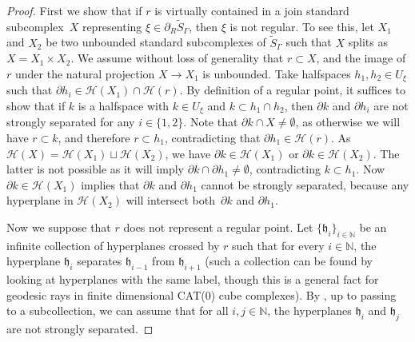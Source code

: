 \documentclass[JEP,XML,SOM,Unicode,NoFloatCountersInSection,published]{cedram}
\let\mathcal\mathscr
\theoremstyle{plain}
\theoremstyle{definition}
\begin{document}
\begin{proof}
First we show that if $r$ is virtually contained in a join standard subcomplex~$X$ representing $\xi\in \partial_R \widetilde{S}_\Gamma$, then $\xi$ is not regular. To see this, let $X_1$ and $X_2$ be two unbounded standard subcomplexes of $\widetilde{S}_\Gamma$ such that $X$ splits as $X=X_1\times X_2$. We assume without loss of generality that $r\subset X$, and the image of $r$ under the natural projection $X\to X_1$ is unbounded. Take halfspaces $h_1,h_2\in U_\xi$ such that $\partial h_i\in \mathcal H(X_1)\cap\mathcal H(r)$. By definition of a regular point, it suffices to show that if $k$ is a halfspace with $k\in U_\xi$ and $k\subset h_1\cap h_2$, then $\partial k$ and $\partial h_i$ are not strongly separated for any $i\in\{1,2\}$. Note that $\partial k\cap X\neq \emptyset$, as otherwise we will have $r\subset k$, and therefore $r\subset h_1$, contradicting that $\partial h_1\in \mathcal H(r)$. As $\mathcal H(X)=\mathcal H(X_1)\sqcup\mathcal H(X_2)$, we have $\partial k\in \mathcal H(X_1)$ or $\partial k\in \mathcal H(X_2)$. The latter is not possible as it will imply $\partial k\cap\partial h_1\neq\emptyset$, contradicting $k\subset h_1$. Now $\partial k\in \mathcal H(X_1)$ implies that $\partial k$ and $\partial h_1$ cannot be strongly separated, because any hyperplane in $\mathcal H(X_2)$ will intersect both~$\partial k$ and $\partial h_1$.\enlargethispage{\baselineskip}%

Now we suppose that $r$ does not represent a regular point. Let $\{\mathfrak h_i\}_{i\in\mathbb{N}}$ be an infinite collection of hyperplanes crossed by $r$ such that for every $i\in\mathbb{N}$, the hyperplane $\mathfrak h_{i}$ separates $\mathfrak h_{i-1}$ from $\mathfrak h_{i+1}$ (such a collection can be found by looking at hyperplanes with the same label, though this is a general fact for geodesic rays in finite dimensional CAT(0) cube complexes). By \cite[Prop.\,7.5]{Fer}, up to passing to a subcollection, we can assume that for all $i,j\in\mathbb{N}$, the hyperplanes $\mathfrak h_i$ and $\mathfrak h_j$ are not strongly separated.


\end{proof}
\end{document}
